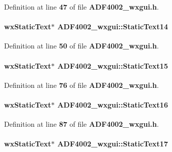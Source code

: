 Definition at line {\bf 47} of file {\bf A\+D\+F4002\+\_\+wxgui.\+h}.

\paragraph[{Static\+Text14}]{\setlength{\rightskip}{0pt plus 5cm}wx\+Static\+Text$\ast$ A\+D\+F4002\+\_\+wxgui\+::\+Static\+Text14}\label{classADF4002__wxgui_a6057735376cd2cda27c247f780ff6175}


Definition at line {\bf 50} of file {\bf A\+D\+F4002\+\_\+wxgui.\+h}.

\paragraph[{Static\+Text15}]{\setlength{\rightskip}{0pt plus 5cm}wx\+Static\+Text$\ast$ A\+D\+F4002\+\_\+wxgui\+::\+Static\+Text15}\label{classADF4002__wxgui_ac4a792f0853bf34e81532b6704369822}


Definition at line {\bf 76} of file {\bf A\+D\+F4002\+\_\+wxgui.\+h}.

\paragraph[{Static\+Text16}]{\setlength{\rightskip}{0pt plus 5cm}wx\+Static\+Text$\ast$ A\+D\+F4002\+\_\+wxgui\+::\+Static\+Text16}\label{classADF4002__wxgui_a808723e7f9b2f8a3b666a289382a5fa5}


Definition at line {\bf 87} of file {\bf A\+D\+F4002\+\_\+wxgui.\+h}.

\paragraph[{Static\+Text17}]{\setlength{\rightskip}{0pt plus 5cm}wx\+Static\+Text$\ast$ A\+D\+F4002\+\_\+wxgui\+::\+Static\+Text17}\label{classADF4002__wxgui_ad2f9d6a473cabd617572acdfa6e56729}


